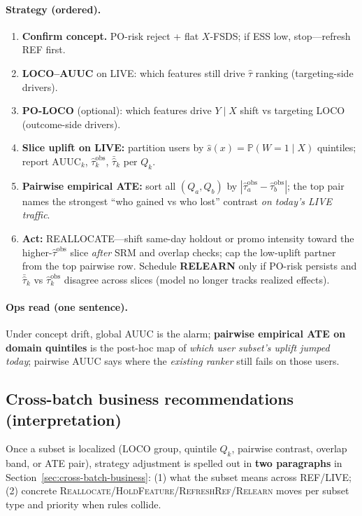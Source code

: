 \paragraph{Strategy (ordered).}
\begin{enumerate}
  \item \textbf{Confirm concept.} PO-risk reject + flat $X$-FSDS; if ESS low, stop---refresh REF first.
  \item \textbf{LOCO--AUUC} on LIVE: which features still drive $\hat\tau$ ranking (targeting-side drivers).
  \item \textbf{PO-LOCO} (optional): which features drive $Y\mid X$ shift vs targeting LOCO (outcome-side drivers).
  \item \textbf{Slice uplift on LIVE:} partition users by $\hat s(x)=\mathbb P(W{=}1\mid X)$ quintiles; report $\mathrm{AUUC}_k$, $\widehat{\tau}^{\mathrm{obs}}_k$, $\bar{\hat\tau}_k$ per $Q_k$.
  \item \textbf{Pairwise empirical ATE:} sort all $(Q_a,Q_b)$ by $|\widehat{\tau}^{\mathrm{obs}}_a-\widehat{\tau}^{\mathrm{obs}}_b|$; the top pair names the strongest ``who gained vs who lost'' contrast \emph{on today's LIVE traffic}.
  \item \textbf{Act:} REALLOCATE---shift same-day holdout or promo intensity toward the higher-$\widehat{\tau}^{\mathrm{obs}}$ slice \emph{after} SRM and overlap checks; cap the low-uplift partner from the top pairwise row.
  Schedule \textbf{RELEARN} only if PO-risk persists and $\bar{\hat\tau}_k$ vs $\widehat{\tau}^{\mathrm{obs}}_k$ disagree across slices (model no longer tracks realized effects).
\end{enumerate}

\paragraph{Ops read (one sentence).}
Under concept drift, global AUUC is the alarm; \textbf{pairwise empirical ATE on domain quintiles} is the post-hoc map of \emph{which user subset's uplift jumped today}; pairwise AUUC says where the \emph{existing ranker} still fails on those users.

\subsection{Cross-batch business recommendations (interpretation)}

Once a subset is localized (LOCO group, quintile $Q_k$, pairwise contrast, overlap band, or ATE pair), strategy adjustment is spelled out in \textbf{two paragraphs} in Section~\ref{sec:cross-batch-business}: (1) what the subset means across REF/LIVE; (2) concrete \textsc{Reallocate}/\textsc{HoldFeature}/\textsc{RefreshRef}/\textsc{Relearn} moves per subset type and priority when rules collide.

